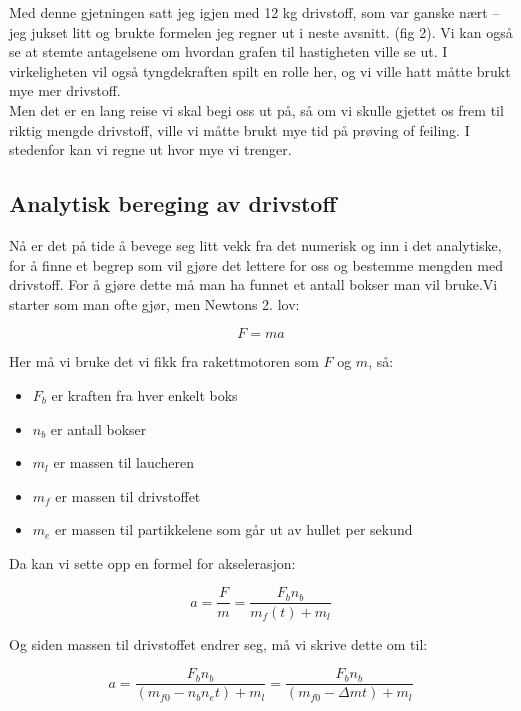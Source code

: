 \documentclass[a4paper,norsk,11pt,twoside]{article}
\begin{document}
Med denne gjetningen satt jeg igjen med 12 kg drivstoff, som var ganske nært --jeg jukset litt og brukte formelen jeg regner ut i neste avsnitt. (fig 2). Vi kan også se at stemte antagelsene om hvordan grafen til hastigheten ville se ut. I virkeligheten vil også tyngdekraften spilt en rolle her, og vi ville hatt måtte brukt mye mer drivstoff. \\

Men det er en lang reise vi skal begi oss ut på, så om vi skulle gjettet os frem til riktig mengde drivstoff, ville vi måtte brukt mye tid på prøving of feiling. I stedenfor kan vi regne ut hvor mye vi trenger.


\subsection{Analytisk bereging av drivstoff}

Nå er det på tide å bevege seg litt vekk fra det numerisk og inn i det analytiske, for å finne et begrep som vil gjøre det lettere for oss og bestemme mengden med drivstoff. For å gjøre dette må man ha funnet et antall bokser man vil bruke.Vi starter som man ofte gjør, men Newtons 2. lov:

\begin{equation}
F = ma
\end{equation}

Her må vi bruke det vi fikk fra rakettmotoren som $F$ og $m$, så:

\begin{itemize}
\item $F_b$ er kraften fra hver enkelt boks
\item $n_b$ er antall bokser
\item $m_l$ er massen til laucheren
\item $m_f$ er massen til drivstoffet
\item $m_e$ er massen til partikkelene som går ut av hullet per sekund
\end{itemize}

Da kan vi sette opp en formel for akselerasjon:

\begin{equation}
a = \frac{F}{m} = \frac{F_b n_b}{m_f(t) + m_l} 
\end{equation} 

Og siden massen til drivstoffet endrer seg, må vi skrive dette om til:

\begin{equation}
a = \frac{F_b n_b}{(m_{f0} - n_b n_e t) + m_l} = \frac{F_b n_b}{(m_{f0} - \Delta m t) + m_l}
\end{equation} 
\end{document}
